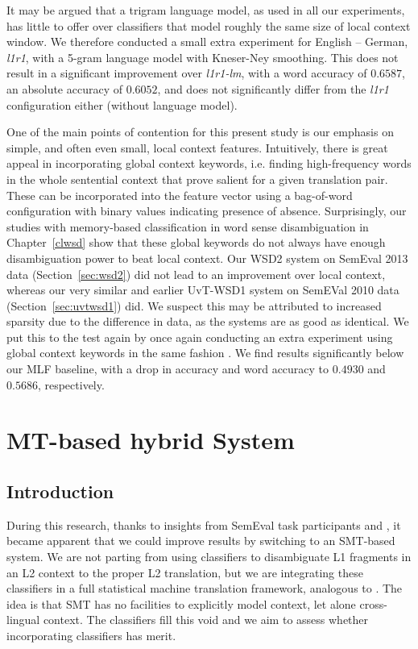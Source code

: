 It may be argued that a trigram language model, as used in all our experiments,
has little to offer over classifiers that model roughly the same size of local
context window. We therefore conducted a small extra experiment for English --
German, \emph{l1r1}, with a 5-gram language model with Kneser-Ney smoothing. This does
not result in a significant improvement over \emph{l1r1-lm}, with a word accuracy of
$0.6587$, an absolute accuracy of $0.6052$, and does not significantly differ
from the \emph{l1r1} configuration either (without language model).  %

One of the main points of contention for this present study is our emphasis on
simple, and often even small, local context features. Intuitively, there is
great appeal in incorporating global context keywords, i.e. finding
high-frequency words in the whole sentential context that prove salient for a
given translation pair. These can be incorporated into the feature vector using
a bag-of-word configuration with binary values indicating presence of absence.
Surprisingly, our studies with memory-based classification in word sense
disambiguation in Chapter~\ref{clwsd} show that these global keywords do not
always have enough disambiguation power to beat local context. Our WSD2 system
on SemEval 2013 data (Section~\ref{sec:wsd2}) did not lead to an improvement
over local context, whereas our very similar and earlier UvT-WSD1 system on
SemEVal 2010 data (Section~\ref{sec:uvtwsd1}) did. We suspect this may be
attributed to increased sparsity due to the difference in data, as the systems
are as good as identical. We put this to the test again by once again
conducting an extra experiment using global context keywords in the same
fashion \citep{NgL96}. We find results significantly below our MLF baseline, with
a drop in accuracy and word accuracy to $0.4930$ and $0.5686$, respectively.

\section{MT-based hybrid System}
\label{sec:mtbased}

\subsection{Introduction}

During this research, thanks to insights from SemEval task
participants \cite{UEDIN} and \cite{CNRC}, it became apparent that we
could improve results by switching to an SMT-based system. We are not
parting from using classifiers to disambiguate L1 fragments in an L2
context to the proper L2 translation, but we are integrating these
classifiers in a full statistical machine translation framework,
analogous to \cite{Haque+11}. The idea is that SMT has no facilities to
explicitly model context, let alone cross-lingual context. The classifiers fill
this void and we aim to assess whether incorporating classifiers has merit.


